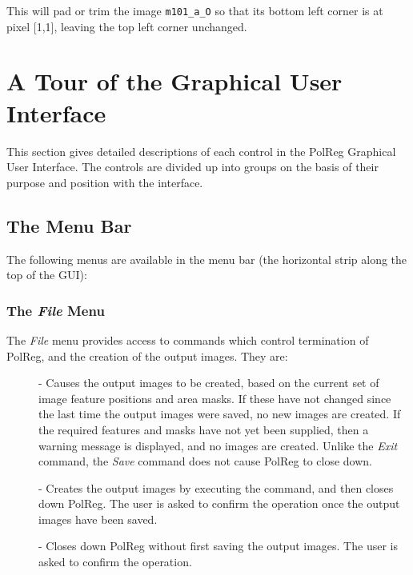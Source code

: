 This will pad or trim the image {\tt m101\_a\_O} so that its bottom left 
corner is at pixel [1,1], leaving the top left corner unchanged.

\section {A Tour of the Graphical User Interface}
This section gives detailed descriptions of each control in the PolReg 
Graphical User Interface. The controls are divided up into groups on the
basis of their purpose and position with the interface.

\subsection {The Menu Bar}
The following menus are available in the menu bar (the horizontal strip 
along the top of the GUI):

\subsubsection {The {\em File} Menu}
The {\em File} menu provides access to commands which control
termination of PolReg, and the creation of the output images. They are:

\begin{description}

\item [] - Causes the output images to be
created, based on the current set of image feature positions and area masks. If
these have not changed since the last time the output images were saved,
no new images are created. If the required features and masks have not
yet been supplied, then a warning message is displayed, and no images are
created. Unlike the {\em Exit} command, the {\em Save} command does not
cause PolReg to close down.

\item  [] - Creates the output images by executing
the  command, and then closes down
PolReg. The user is asked to confirm the operation once the output images
have been saved.

\item  [] - Closes down PolReg without first saving the output
images. The user is asked to confirm the operation.

\end{description}

